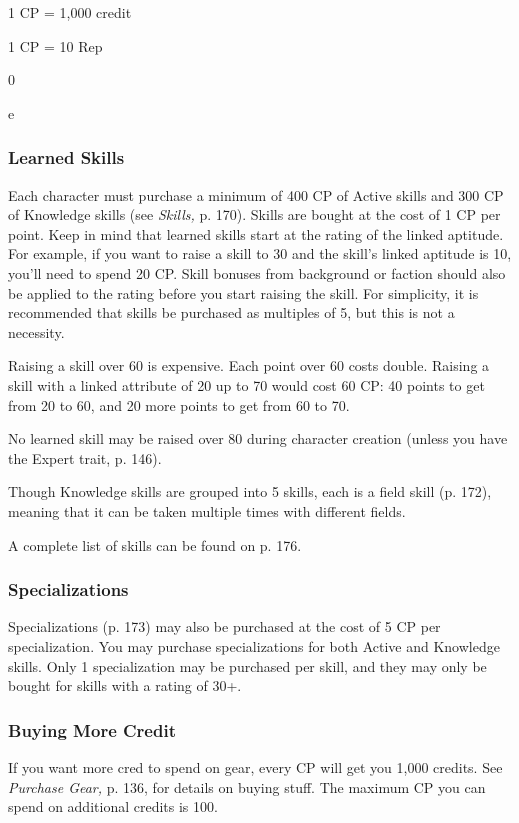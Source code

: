   1 CP = 1,000 credit

  1 CP = 10 Rep

0

e 

\subsubsection{Learned Skills}

Each character must purchase a minimum of 400 CP 
of Active skills and 300 CP of Knowledge skills (see 
\textit{Skills,} p. 170). Skills are bought at the cost of 1 CP 
per point. Keep in mind that learned skills start at the 
rating of the linked aptitude. For example, if you want 
to raise a skill to 30 and the skill's linked aptitude 
is 10, you'll need to spend 20 CP. Skill bonuses from 
background or faction should also be applied to the 
rating before you start raising the skill. For simplicity, 
it is recommended that skills be purchased as multiples
of 5, but this is not a necessity.

Raising a skill over 60 is expensive. Each point over 
60 costs double. Raising a skill with a linked attribute 
of 20 up to 70 would cost 60 CP: 40 points to get from 
20 to 60, and 20 more points to get from 60 to 70.

No learned skill may be raised over 80 during character
creation (unless you have the Expert trait, p. 146).

Though Knowledge skills are grouped into 5 skills, 
each is a field skill (p. 172), meaning that it can be 
taken multiple times with different fields.

A complete list of skills can be found on p. 176.

\subsubsection{Specializations}

Specializations (p. 173) may also be purchased at the 
cost of 5 CP per specialization. You may purchase specializations
for both Active and Knowledge skills. Only
1 specialization may be purchased per skill, and they 
may only be bought for skills with a rating of 30+.

\subsubsection{Buying More Credit}

If you want more cred to spend on gear, every CP will 
get you 1,000 credits. See \textit{Purchase Gear,} p. 136, for 
details on buying stuff. The maximum CP you can 
spend on additional credits is 100.

